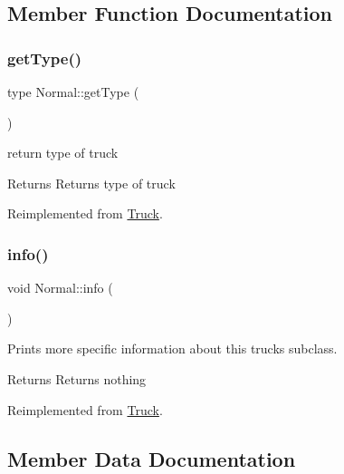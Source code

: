\subsection{Member Function Documentation}
\mbox{\label{class_normal_ae34be8332ea67df5fb0ae9b274884748}} 
\subsubsection{\texorpdfstring{get\+Type()}{getType()}}
{\footnotesize\ttfamily type Normal\+::get\+Type (\begin{DoxyParamCaption}{ }\end{DoxyParamCaption})\hspace{0.3cm}{\ttfamily [virtual]}}



return type of truck 

\begin{DoxyReturn}{Returns}
Returns type of truck 
\end{DoxyReturn}


Reimplemented from \hyperlink{class_truck_a24406caf4d09be7f3eff069ce6bc015b}{Truck}.

\mbox{\label{class_normal_ade6add2ee09e701113534c97e2a03307}} 
\subsubsection{\texorpdfstring{info()}{info()}}
{\footnotesize\ttfamily void Normal\+::info (\begin{DoxyParamCaption}{ }\end{DoxyParamCaption})\hspace{0.3cm}{\ttfamily [virtual]}}



Prints more specific information about this truck\textquotesingle{}s subclass. 

\begin{DoxyReturn}{Returns}
Returns nothing 
\end{DoxyReturn}


Reimplemented from \hyperlink{class_truck_a38f09eab2822524e355ecf6d0a13f7de}{Truck}.



\subsection{Member Data Documentation}
\mbox{\label{class_normal_a1ccae0db66db16a387c05009bf7194f8}} 
